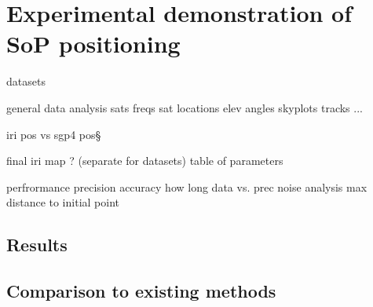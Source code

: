 \chapter{Experimental demonstration of SoP positioning}
\label{s_exp}

datasets

general data analysis
    sats
    freqs
    sat locations
    elev angles
    skyplots
    tracks
    ...

iri pos vs sgp4 pos§


final iri map ? (separate for datasets)
table of parameters

perfrormance
    precision
    accuracy
    how long data vs. prec
    noise analysis
    max distance to  initial point


\section{Results}

\section{Comparison to existing methods}
